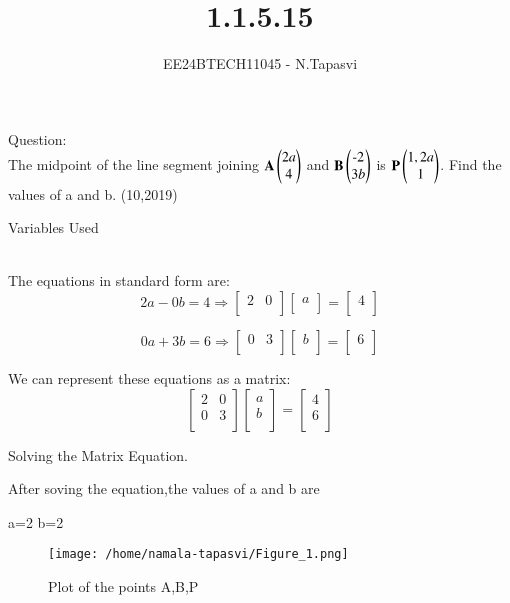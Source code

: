 \documentclass[journal]{IEEEtran}
\begin{document}

\vspace{3cm}

\title{1.1.5.15}
\author{EE24BTECH11045 - N.Tapasvi}
{\let\newpage\relax\maketitle}
Question:\\
The midpoint of the line segment joining $\mathbf{A}\begin{pmatrix}2a\\4\end{pmatrix}$ and $\mathbf{B}\begin{pmatrix}\text{-}2\\3b\end{pmatrix}$ is $\mathbf{P}\begin{pmatrix}1, 2a\\1\end{pmatrix}$. Find the values of a and b.
\hfill (10,2019)
\\
\solution
\begin{table}[h!]    
  \centering
  
  \caption{Variables Used}
  \label{tab1-1.9-6}
\end{table}\\
The equations in standard form are:
\[
2a - 0b = 4 \Rightarrow
\begin{bmatrix}
2 & 0 \\
\end{bmatrix}
\begin{bmatrix}
a \\
\end{bmatrix}
=
\begin{bmatrix}
4 \\
\end{bmatrix}
\]

\[
0a + 3b = 6 \Rightarrow
\begin{bmatrix}
0 & 3 \\
\end{bmatrix}
\begin{bmatrix}
b \\
\end{bmatrix}
=
\begin{bmatrix}
6 \\
\end{bmatrix}
\]

We can represent these equations as a matrix:
\[
\begin{bmatrix}
2 & 0 \\
0 & 3 \\
\end{bmatrix}
\begin{bmatrix}
a \\
b \\
\end{bmatrix}
=
\begin{bmatrix}
4 \\
6 \\
\end{bmatrix}
\]

Solving the Matrix Equation.

After soving the equation,the values of a and b are

a=2
b=2
\begin{figure}[h!]
   \centering
   \texttt{[image: /home/namala-tapasvi/Figure\_1.png]}
   \caption{Plot of the points A,B,P}
   \label{stemplot}
\end{figure}
\end{document}
